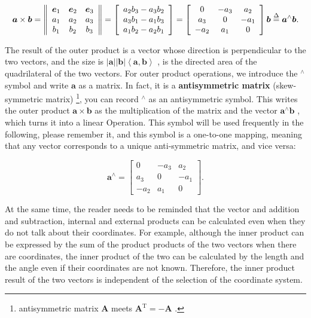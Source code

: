 \begin{equation}
\label{eq:cross}
\bm{a} \times \bm{b} = \left\| {\begin{array}{*{20}{c}}
	\bm{e}_1 & \bm{e}_2 & \bm{e}_3 \\
	{{a_1}}&{{a_2}}&{{a_3}}\\
	{{b_1}}&{{b_2}}&{{b_3}}
	\end{array}} \right\| = \left[ \begin{array}{l}
{a_2}{b_3} - {a_3}{b_2}\\
{a_3}{b_1} - {a_1}{b_3}\\
{a_1}{b_2} - {a_2}{b_1}
\end{array} \right] = \left[ {\begin{array}{*{20}{c}}
	0&{ - {a_3}}&{{a_2}}\\
	{{a_3}}&0&{-{a_1}}\\  
	{-{a_2}}&{{a_1}}&0  
	\end{array}} \right] \bm{b} \buildrel \Delta \over = { \bm{a}^ \wedge } \bm{b}.
\end{equation}

The result of the outer product is a vector whose direction is perpendicular to the two vectors, and the size is $ \left | \bm{a} \right | \left | \bm{b} \right | \left \langle { \bm {a}, \bm {b}} \right \rangle  $ , is the directed area of the quadrilateral of the two vectors.
For outer product operations, we introduce the $ ^ \wedge $ symbol and write $ \bm{a} $ as a matrix. In fact, it is a \textbf {antisymmetric matrix} (skew-symmetric matrix) \footnote{antisymmetric matrix $ \bm{A} $ meets $ \bm{A}^ \mathrm{T}=- \bm{A} $ . }, you can record $ ^ \wedge $ as an antisymmetric symbol.
This writes the outer product $ \bm{a} \times  \bm{b} $ as the multiplication of the matrix and the vector $ { \bm{a}^ \wedge } \bm{b} $ , which turns it into a linear Operation.
This symbol will be used frequently in the following, please remember it, and this symbol is a one-to-one mapping, meaning that any vector corresponds to a unique anti-symmetric matrix, and vice versa:

\begin{equation}
\bm{a}^\wedge = \left[ {\begin{array}{*{20}{c}}
	0&{-{a_3}}&{{a_2}}\\  
	{{a_3}}&0&{ - {a_1}}\\
	{ - {a_2}}&{{a_1}}&0
	\end{array}} \right].
\end{equation}

At the same time, the reader needs to be reminded that the vector and addition and subtraction, internal and external products can be calculated even when they do not talk about their coordinates. For example, although the inner product can be expressed by the sum of the product products of the two vectors when there are coordinates, the inner product of the two can be calculated by the length and the angle even if their coordinates are not known. Therefore, the inner product result of the two vectors is independent of the selection of the coordinate system.
